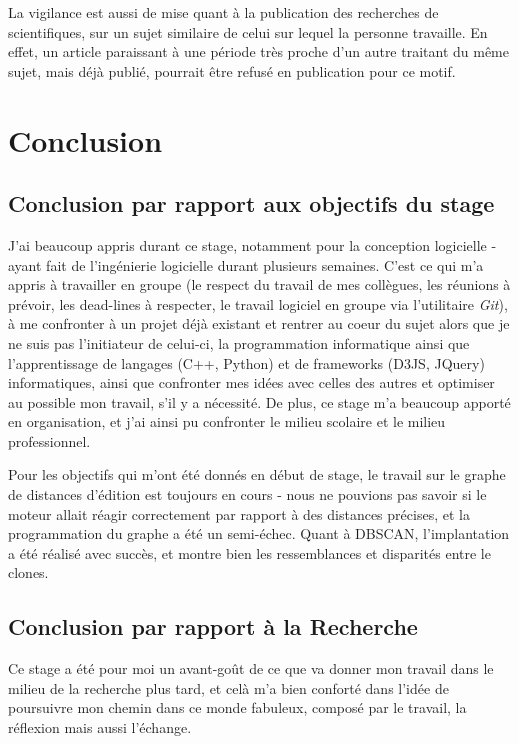 \documentclass[pdftex,12pt,a4paper]{report}
\begin{document}
\begin{spacing}{1.2}
La vigilance est aussi de mise quant à la publication des recherches de scientifiques, sur un sujet similaire de celui sur lequel la personne travaille. En effet, un article paraissant à une période très proche d'un autre traitant du même sujet, mais déjà publié, pourrait être refusé en publication pour ce motif.

\chapter*{Conclusion}


\section*{Conclusion par rapport aux objectifs du stage}

J'ai beaucoup appris durant ce stage, notamment pour la conception logicielle - ayant fait de l'ingénierie logicielle durant plusieurs semaines. C'est ce qui m'a appris à travailler en groupe (le respect du travail de mes collègues, les réunions à prévoir, les dead-lines à respecter, le travail logiciel en groupe via l'utilitaire \textit{Git}), à me confronter à un projet déjà existant et rentrer au coeur du sujet alors que je ne suis pas l'initiateur de celui-ci, la programmation informatique ainsi que l'apprentissage de langages (C++, Python) et de frameworks (D3JS, JQuery) informatiques, ainsi que confronter mes idées avec celles des autres et optimiser au possible mon travail, s'il y a nécessité. De plus, ce stage m'a beaucoup apporté en organisation, et j'ai ainsi pu confronter le milieu scolaire et le milieu professionnel.


Pour les objectifs qui m'ont été donnés en début de stage, le travail sur le graphe de distances d'édition est toujours en cours - nous ne pouvions pas savoir si le moteur allait réagir correctement par rapport à des distances précises, et la programmation du graphe a été un semi-échec.
Quant à DBSCAN, l'implantation a été réalisé avec succès, et montre bien les ressemblances et disparités entre le clones.

\section*{Conclusion par rapport à la Recherche}

Ce stage a été pour moi un avant-goût de ce que va donner mon travail dans le milieu de la recherche plus tard, et celà m'a bien conforté dans l'idée de poursuivre mon chemin dans ce monde fabuleux, composé par le travail, la réflexion mais aussi l'échange.


\end{spacing}
\end{document}
